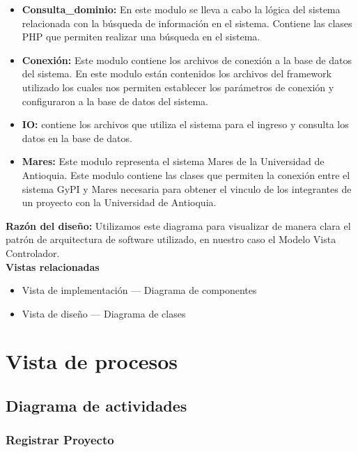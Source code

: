\documentclass[12pt,oneside,letterpaper]{report}
\begin{document}
\begin{itemize}
 \item \textbf{Consulta\_dominio:} En este modulo se lleva a cabo la lógica del sistema relacionada con la búsqueda de información en el sistema. Contiene las clases PHP que permiten realizar una búsqueda en el sistema.
 \item \textbf{Conexión:} Este modulo contiene los archivos de conexión a la base de datos del sistema. En este modulo están contenidos los archivos del framework utilizado los cuales nos permiten establecer los parámetros de conexión y configuraron a la base de datos del sistema.
 \item \textbf{IO:} contiene los archivos que utiliza el sistema para el ingreso y consulta los datos en la base de datos.
 \item \textbf{Mares:} Este modulo representa el sistema Mares de la Universidad de Antioquia. Este modulo contiene las clases que permiten la conexión entre el sistema GyPI y Mares necesaria para obtener el vinculo de los integrantes de un proyecto con la Universidad de Antioquia.
\end{itemize}

\textbf{Razón del diseño:}
Utilizamos este diagrama para visualizar de manera clara el patrón de arquitectura de software utilizado, en nuestro caso el Modelo Vista Controlador.\\

\textbf{Vistas relacionadas}
\begin{itemize}
 \item Vista de implementación --- Diagrama de componentes
 \item Vista de diseño --- Diagrama de clases
\end{itemize}


\section{Vista de procesos}

\subsection{Diagrama de actividades}


\subsubsection{Registrar Proyecto}
\end{document}
